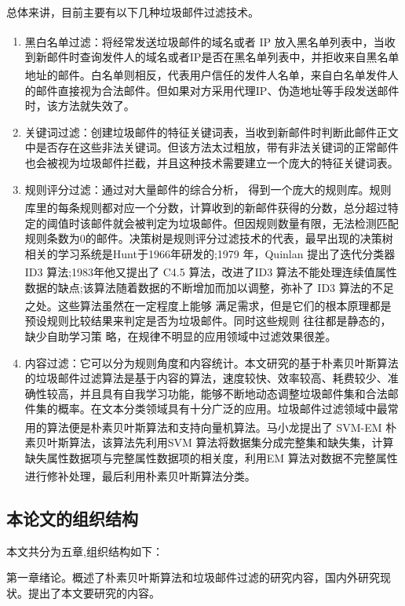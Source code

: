 \documentclass[UTF8,zihao=-4]{ctexart}
\newcommand{\upcite}[1]{\textsuperscript{\cite{#1}}}
\begin{document}
总体来讲，目前主要有以下几种垃圾邮件过滤技术。
\begin{enumerate}
	\item 黑白名单过滤\upcite{anti-spam}：将经常发送垃圾邮件的域名或者 IP 放入黑名单列表中，当收到新邮件时查询发件人的域名或者IP是否在黑名单列表中，并拒收来自黑名单地址的邮件\upcite{zhangpei}。白名单则相反，代表用户信任的发件人名单，来自白名单发件人的邮件直接视为合法邮件。但如果对方采用代理IP、伪造地址等手段发送邮件时，该方法就失效了。
	\item 关键词过滤：创建垃圾邮件的特征关键词表，当收到新邮件时判断此邮件正文中是否存在这些非法关键词。但该方法太过粗放，带有非法关键词的正常邮件也会被视为垃圾邮件拦截，并且这种技术需要建立一个庞大的特征关键词表。
	\item 规则评分过滤：通过对大量邮件的综合分析， 得到一个庞大的规则库。规则库里的每条规则都对应一个分数，计算收到的新邮件获得的分数\upcite{zhangpei}，总分超过特定的阈值时该邮件就会被判定为垃圾邮件。但因规则数量有限，无法检测匹配规则条数为0的邮件。决策树是规则评分过滤技术的代表，最早出现的决策树相关的学习系统是Hunt于1966年研发的;1979 年，Quinlan 提出了迭代分类器 ID3 算法;1983年他又提出了 C4.5 算法\upcite{haibo,wux}，改进了ID3 算法不能处理连续值属性数据的缺点;该算法随着数据的不断增加而加以调整，弥补了 ID3 算法的不足之处\upcite{caocuiling}。这些算法虽然在一定程度上能够 满足需求，但是它们的根本原理都是预设规则比较结果来判定是否为垃圾邮件。同时这些规则 往往都是静态的，缺少自助学习策 略，在规律不明显的应用领域中过滤效果很差。
	
	\item 内容过滤：它可以分为规则角度和内容统计。本文研究的基于朴素贝叶斯算法的垃圾邮件过滤算法是基于内容的算法，速度较快、效率较高、耗费较少、准确性较高，并且具有自我学习功能，能够不断地动态调整垃圾邮件集和合法邮件集的概率。在文本分类领域具有十分广泛的应用。垃圾邮件过滤领域中最常用的算法便是朴素贝叶斯算法和支持向量机算法\upcite{yanglei}。马小龙提出了 SVM-EM 朴素贝叶斯算法，该算法先利用SVM 算法将数据集分成完整集和缺失集，计算缺失属性数据项与完整属性数据项的相关度，利用EM 算法对数据不完整属性进行修补处理，最后利用朴素贝叶斯算法分类\upcite{maxiaolong}。
\end{enumerate}

\subsection{本论文的组织结构}
	本文共分为五章,组织结构如下：
	
	第一章绪论。概述了朴素贝叶斯算法和垃圾邮件过滤的研究内容，国内外研究现状。提出了本文要研究的内容。
	
\end{document}
